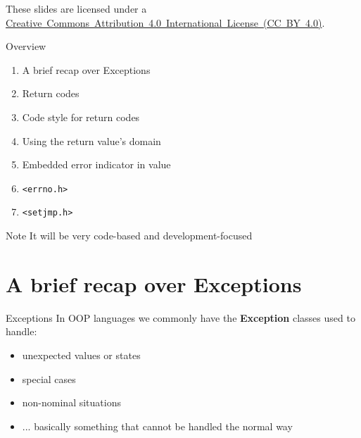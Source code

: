 \documentclass[aspectratio=169,14pt]{beamer}
\begin{document}
\begin{frame}
\titlepage

\begin{center}
    \begin{footnotesize}
    These slides are licensed under a \href{https://creativecommons.org/licenses/by/4.0/}{Creative~Commons~Attribution~4.0~International~License~(CC~BY~4.0)}.
    \end{footnotesize}
\end{center}
\end{frame}



\begin{frame}{Overview}
\begin{enumerate}
    \item A brief recap over Exceptions
    \item Return codes
    \item Code style for return codes
    \item Using the return value's domain
    \item Embedded error indicator in value
    \item \texttt{<errno.h>}
    \item \texttt{<setjmp.h>}
\end{enumerate}

\begin{block}{Note}
It will be very code-based and development-focused
\end{block}
\end{frame}





\section{A brief recap over Exceptions}

\begin{frame}{Exceptions}
In OOP languages we commonly have the \textbf{Exception} classes used to handle:
\begin{itemize}
    \item unexpected values or states
    \item special cases
    \item non-nominal situations
    \item ... basically something that cannot be handled the normal way
\end{itemize}
\end{frame}
\end{document}
